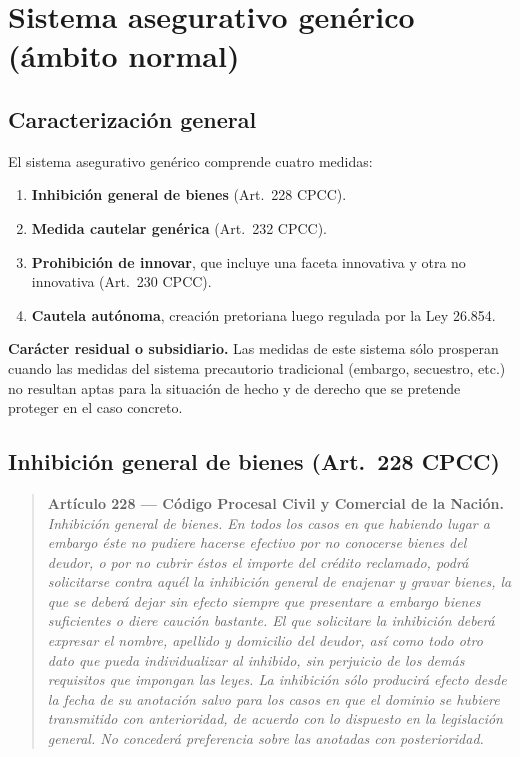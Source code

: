 \documentclass[12pt,oneside]{book}
\begin{document}
\chapter[Sistema asegurativo genérico]{Sistema asegurativo genérico (ámbito normal)}\label{cap:generico}

\section{Caracterización general}

El sistema asegurativo genérico comprende cuatro medidas:

\begin{enumerate}
    \item \textbf{Inhibición general de bienes} (Art.~228 CPCC).
    \item \textbf{Medida cautelar genérica} (Art.~232 CPCC).
    \item \textbf{Prohibición de innovar}, que incluye una faceta innovativa y otra no innovativa (Art.~230 CPCC).
    \item \textbf{Cautela autónoma}, creación pretoriana luego regulada por la Ley 26.854.
\end{enumerate}

\begin{important}
\textbf{Carácter residual o subsidiario.} Las medidas de este sistema sólo prosperan cuando las medidas del sistema precautorio tradicional (embargo, secuestro, etc.) no resultan aptas para la situación de hecho y de derecho que se pretende proteger en el caso concreto.
\end{important}

\section{Inhibición general de bienes (Art.~228 CPCC)}

\begin{quote}
\small
\textbf{Artículo 228 --- Código Procesal Civil y Comercial de la Nación.} \textit{Inhibición general de bienes. En todos los casos en que habiendo lugar a embargo éste no pudiere hacerse efectivo por no conocerse bienes del deudor, o por no cubrir éstos el importe del crédito reclamado, podrá solicitarse contra aquél la inhibición general de enajenar y gravar bienes, la que se deberá dejar sin efecto siempre que presentare a embargo bienes suficientes o diere caución bastante. El que solicitare la inhibición deberá expresar el nombre, apellido y domicilio del deudor, así como todo otro dato que pueda individualizar al inhibido, sin perjuicio de los demás requisitos que impongan las leyes. La inhibición sólo producirá efecto desde la fecha de su anotación salvo para los casos en que el dominio se hubiere transmitido con anterioridad, de acuerdo con lo dispuesto en la legislación general. No concederá preferencia sobre las anotadas con posterioridad.}
\end{quote}
\end{document}
